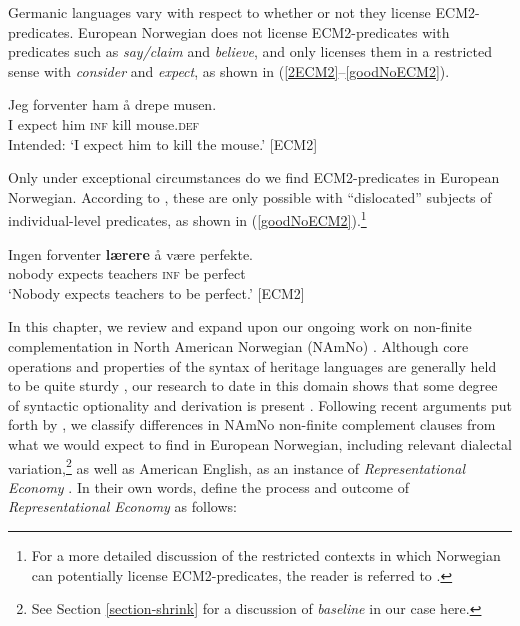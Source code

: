 \documentclass[output=paper,colorlinks,citecolor=brown]{langscibook}
\begin{document}
Germanic languages vary with respect to whether or not they license ECM2-predicates. European Norwegian  does not license ECM2-predicates with predicates such as \textit{say/claim} and \textit{believe}, and only licenses them in a restricted sense with \textit{consider} and \textit{expect}, as shown in (\ref{2ECM2}--\ref{goodNoECM2}). 

\begin{exe}
\item \label{2ECM2}
     \gll *Jeg forventer ham \aa {} drepe musen. \\
          I expect him \textsc{inf} kill mouse.\textsc{def} \\
         \glt Intended: `I expect him to kill the mouse.' \hfill[ECM2] \\
         \citep[394]{christo2020}
\end{exe}

Only under exceptional circumstances do we find ECM2-predicates in European Norwegian. According to \citet{lodrup2008}, these are only possible with “dislocated” subjects of individual-level predicates, as shown in (\ref{goodNoECM2}).\footnote{For a more detailed discussion of the restricted contexts in which Norwegian can potentially license ECM2-predicates, the reader is referred to \citet{lodrup2002,lodrup2008}.}

\begin{exe}
\item \gll Ingen forventer \textbf{l{\ae}rere} {\aa} v{\ae}re perfekte. \\
         nobody expects teachers \textsc{inf} be perfect \\
        \glt `Nobody expects teachers to be perfect.' \hfill[ECM2] \\
         \citep[3]{lodrup2002}\label{goodNoECM2}

\end{exe} 

In this chapter, we review and expand upon our ongoing work on non-finite complementation in North American Norwegian (NAmNo) \citep{Softelandetal2021,putsoft,putsoft23}. Although core operations and properties of the syntax of heritage languages are generally held to be quite sturdy \citep{lohndal2021}, our research to date in this domain shows that some degree of syntactic optionality and derivation is present \citep{silvia2011}. Following recent arguments put forth by \citet{putPDtoappear}, we classify differences in NAmNo non-finite complement clauses from what we would expect to find in European Norwegian, including relevant dialectal variation,\footnote{See Section \ref{section-shrink} for a discussion of \textit{baseline} in our case here.} as well as American English, as an instance of \textit{Representational Economy} \citep{scontras2018,polinsky2020}. In their own words, \citet[3]{scontras2018} define the process and outcome of \textit{Representational Economy} as follows:
\end{document}
